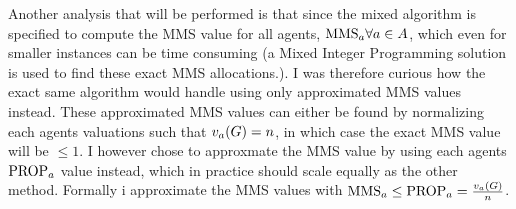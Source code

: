Another analysis that will be performed is that since the mixed algorithm is specified to compute the MMS value for all agents, $\text{MMS}_a\forall a\in A$, which even for smaller instances can be time consuming (a Mixed Integer Programming solution is used to find these exact MMS allocations.). I was therefore curious how the exact same algorithm would handle using only approximated MMS values instead. These approximated MMS values can either be found by normalizing each agents valuations such that $v_a(G)=n$, in which case the exact MMS value will be $\leq1$. I however chose to approxmate the MMS value by using each agents $\text{PROP}_a$ value instead, which in practice should scale equally as the other method. Formally i approximate the MMS values with $\text{MMS}_a\leq\text{PROP}_a=\frac{v_a(G)}{n}$.


